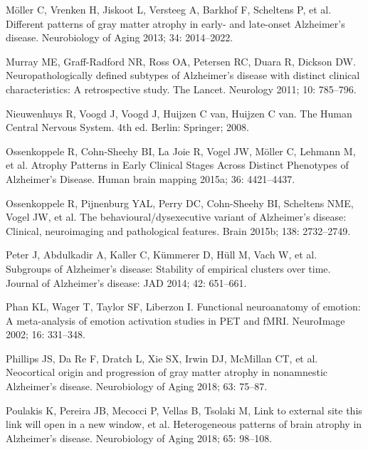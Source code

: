 \documentclass[]{article}
\begin{document}
\hypertarget{ref-moller_different_2013}{}
Möller C, Vrenken H, Jiskoot L, Versteeg A, Barkhof F, Scheltens P, et
al. Different patterns of gray matter atrophy in early- and late-onset
Alzheimer's disease. Neurobiology of Aging 2013; 34: 2014--2022.

\hypertarget{ref-murray_neuropathologically_2011}{}
Murray ME, Graff-Radford NR, Ross OA, Petersen RC, Duara R, Dickson DW.
Neuropathologically defined subtypes of Alzheimer's disease with
distinct clinical characteristics: A retrospective study. The Lancet.
Neurology 2011; 10: 785--796.

\hypertarget{ref-nieuwenhuys_human_2008}{}
Nieuwenhuys R, Voogd J, Voogd J, Huijzen C van, Huijzen C van. The Human
Central Nervous System. 4th ed. Berlin: Springer; 2008.

\hypertarget{ref-ossenkoppele_atrophy_2015}{}
Ossenkoppele R, Cohn-Sheehy BI, La Joie R, Vogel JW, Möller C, Lehmann
M, et al. Atrophy Patterns in Early Clinical Stages Across Distinct
Phenotypes of Alzheimer's Disease. Human brain mapping 2015a; 36:
4421--4437.

\hypertarget{ref-ossenkoppele_behaviouralux2fdysexecutive_2015}{}
Ossenkoppele R, Pijnenburg YAL, Perry DC, Cohn-Sheehy BI, Scheltens NME,
Vogel JW, et al. The behavioural/dysexecutive variant of Alzheimer's
disease: Clinical, neuroimaging and pathological features. Brain 2015b;
138: 2732--2749.

\hypertarget{ref-peter_subgroups_2014}{}
Peter J, Abdulkadir A, Kaller C, Kümmerer D, Hüll M, Vach W, et al.
Subgroups of Alzheimer's disease: Stability of empirical clusters over
time. Journal of Alzheimer's disease: JAD 2014; 42: 651--661.

\hypertarget{ref-phan_functional_2002}{}
Phan KL, Wager T, Taylor SF, Liberzon I. Functional neuroanatomy of
emotion: A meta-analysis of emotion activation studies in PET and fMRI.
NeuroImage 2002; 16: 331--348.

\hypertarget{ref-phillips_neocortical_2018}{}
Phillips JS, Da Re F, Dratch L, Xie SX, Irwin DJ, McMillan CT, et al.
Neocortical origin and progression of gray matter atrophy in nonamnestic
Alzheimer's disease. Neurobiology of Aging 2018; 63: 75--87.

\hypertarget{ref-poulakis_heterogeneous_2018}{}
Poulakis K, Pereira JB, Mecocci P, Vellas B, Tsolaki M, Link to external
site this link will open in a new window, et al. Heterogeneous patterns
of brain atrophy in Alzheimer's disease. Neurobiology of Aging 2018; 65:
98--108.
\end{document}

